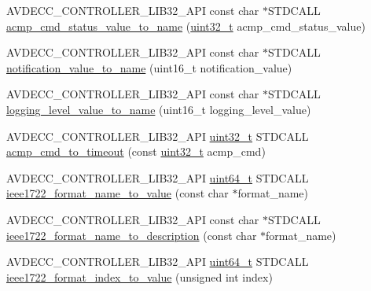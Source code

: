 \begin{DoxyCompactItemize}
\item 
A\+V\+D\+E\+C\+C\+\_\+\+C\+O\+N\+T\+R\+O\+L\+L\+E\+R\+\_\+\+L\+I\+B32\+\_\+\+A\+PI const char $\ast$S\+T\+D\+C\+A\+LL \hyperlink{namespaceavdecc__lib_1_1utility_a997ca93009ef89352844dec17b15719f}{acmp\+\_\+cmd\+\_\+status\+\_\+value\+\_\+to\+\_\+name} (\hyperlink{parse_8c_a6eb1e68cc391dd753bc8ce896dbb8315}{uint32\+\_\+t} acmp\+\_\+cmd\+\_\+status\+\_\+value)
\item 
A\+V\+D\+E\+C\+C\+\_\+\+C\+O\+N\+T\+R\+O\+L\+L\+E\+R\+\_\+\+L\+I\+B32\+\_\+\+A\+PI const char $\ast$S\+T\+D\+C\+A\+LL \hyperlink{namespaceavdecc__lib_1_1utility_a8b711a8b94eb1be638675a9e0c97d404}{notification\+\_\+value\+\_\+to\+\_\+name} (uint16\+\_\+t notification\+\_\+value)
\item 
A\+V\+D\+E\+C\+C\+\_\+\+C\+O\+N\+T\+R\+O\+L\+L\+E\+R\+\_\+\+L\+I\+B32\+\_\+\+A\+PI const char $\ast$S\+T\+D\+C\+A\+LL \hyperlink{namespaceavdecc__lib_1_1utility_a8de9c558c33109aae8eb0fae10468431}{logging\+\_\+level\+\_\+value\+\_\+to\+\_\+name} (uint16\+\_\+t logging\+\_\+level\+\_\+value)
\item 
A\+V\+D\+E\+C\+C\+\_\+\+C\+O\+N\+T\+R\+O\+L\+L\+E\+R\+\_\+\+L\+I\+B32\+\_\+\+A\+PI \hyperlink{parse_8c_a6eb1e68cc391dd753bc8ce896dbb8315}{uint32\+\_\+t} S\+T\+D\+C\+A\+LL \hyperlink{namespaceavdecc__lib_1_1utility_a146d6f5e7a915c5e59058fafc6e6402c}{acmp\+\_\+cmd\+\_\+to\+\_\+timeout} (const \hyperlink{parse_8c_a6eb1e68cc391dd753bc8ce896dbb8315}{uint32\+\_\+t} acmp\+\_\+cmd)
\item 
A\+V\+D\+E\+C\+C\+\_\+\+C\+O\+N\+T\+R\+O\+L\+L\+E\+R\+\_\+\+L\+I\+B32\+\_\+\+A\+PI \hyperlink{parse_8c_aec6fcb673ff035718c238c8c9d544c47}{uint64\+\_\+t} S\+T\+D\+C\+A\+LL \hyperlink{namespaceavdecc__lib_1_1utility_abde103d2263df28ca5d366435cb10dc2}{ieee1722\+\_\+format\+\_\+name\+\_\+to\+\_\+value} (const char $\ast$format\+\_\+name)
\item 
A\+V\+D\+E\+C\+C\+\_\+\+C\+O\+N\+T\+R\+O\+L\+L\+E\+R\+\_\+\+L\+I\+B32\+\_\+\+A\+PI const char $\ast$S\+T\+D\+C\+A\+LL \hyperlink{namespaceavdecc__lib_1_1utility_a321555c304a22b84d8d7c8c71c0f54c0}{ieee1722\+\_\+format\+\_\+name\+\_\+to\+\_\+description} (const char $\ast$format\+\_\+name)
\item 
A\+V\+D\+E\+C\+C\+\_\+\+C\+O\+N\+T\+R\+O\+L\+L\+E\+R\+\_\+\+L\+I\+B32\+\_\+\+A\+PI \hyperlink{parse_8c_aec6fcb673ff035718c238c8c9d544c47}{uint64\+\_\+t} S\+T\+D\+C\+A\+LL \hyperlink{namespaceavdecc__lib_1_1utility_a0c84e161bd14ecd50137b4f16a1fb4f8}{ieee1722\+\_\+format\+\_\+index\+\_\+to\+\_\+value} (unsigned int index)
\item 

\end{DoxyCompactItemize}
